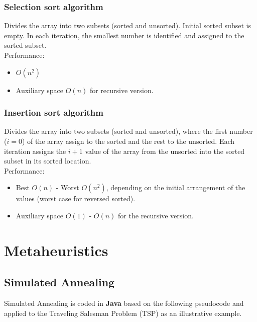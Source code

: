 \documentclass[10pt,bezier]{article}
\begin{document}
\subsubsection{Selection sort algorithm} \label{section5.2.5}
Divides the array into two subsets (sorted and unsorted). Initial sorted subset is empty. In each iteration, the smallest number is identified and assigned to the sorted subset.\\

Performance:
\begin{itemize}
  \item $O(n^2)$
  \item Auxiliary space $O(n)$ for recursive version.
\end{itemize}

\subsubsection{Insertion sort algorithm} \label{section5.2.6}
Divides the array into two subsets (sorted and unsorted),  where the first number ($i=0$) of the array assign to the sorted and the rest to the unsorted. Each iteration assigns the $i+1$ value of the array from the unsorted into the sorted subset in its sorted location.\\

Performance:
\begin{itemize}
  \item Best $O(n)$ - Worst $O(n^2)$, depending on the initial arrangement of the values (worst case for reversed sorted).
  \item Auxiliary space $O(1)$ - $O(n)$ for the recursive version.
\end{itemize}

\newpage
\section{Metaheuristics}\label{section6}

\subsection{Simulated Annealing}\label{section6.1}
Simulated Annealing is coded in {\color{blue}\textbf{Java}} based on the following pseudocode and applied to the Traveling Salesman Problem (TSP) as an illustrative example.
\end{document}
